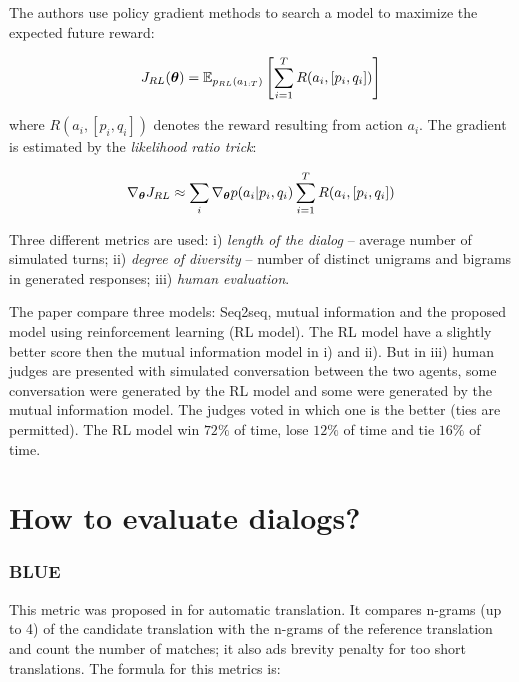 \par The authors use policy gradient methods to search a model to maximize the expected future reward:

\begin{equation}
J_{RL}(\bm{\theta}) = \operatorname{\mathbb{E}}_{p_{RL}(a_{1:T})} \left[\sum_{i=1}^{T} R(a_i, [p_i, q_i]) \right]
\end{equation}

where $R(a_i, [p_i, q_i])$ denotes the reward resulting from action $a_i$. The gradient is estimated by the \textit{likelihood ratio trick}:

\begin{equation}
\nabla_{\bm{\theta}} {J_{RL}} \approx \sum_{i} \nabla_{\bm{\theta}} {p(a_{i} | p_{i}, q_{i})} \sum_{i=1}^{T}R(a_i, [p_{i}, q_{i}])
\end{equation}

\par Three different metrics are used: i) \textit{length of the dialog} -- average number of simulated turns; ii) \textit{degree of diversity} -- number of distinct unigrams and bigrams in generated responses; iii) \textit{human evaluation}.

\par The paper compare three models: Seq2seq, mutual information and the proposed model using reinforcement learning (RL model). The RL model have a slightly better score then the mutual information model in i) and ii). But in iii) human judges are presented with simulated conversation between the two agents, some conversation were generated by the RL model and some were generated by the mutual information model. The judges voted in which one is the better (ties are permitted).  The RL model win $72\%$ of time, lose $12\%$ of time and tie $16\%$ of time.

\section{How to evaluate dialogs?}


\subsubsection{BLUE}
This metric was proposed in \cite{Papineni2001} for automatic translation. It compares n-grams (up to 4) of the candidate translation with the n-grams of the reference translation and count the number of matches; it also ads brevity penalty for too short translations. The formula for this metrics is:

